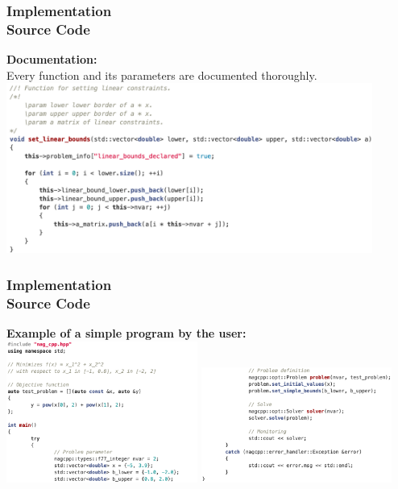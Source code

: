 \documentclass[ucs,10pt]{beamer}
\begin{document}
\begin{frame}
\frametitle{Implementation \\
\small \color{rwth-blue} Source Code}
\textbf{Documentation:}\\ \vspace{1ex}
Every function and its parameters are documented thoroughly.\\
\vspace{1em}
\includegraphics[width=0.9\textwidth]{code_docu.png}
\end{frame}

\begin{frame}
\frametitle{Implementation \\
\small \color{rwth-blue} Source Code}
\textbf{Example of a simple program by the user:}\\ \vspace{1em}
\includegraphics[width=0.47\textwidth]{code_eg1.png}
\includegraphics[width=0.47\textwidth]{code_eg2.png}
\end{frame}
\end{document}

